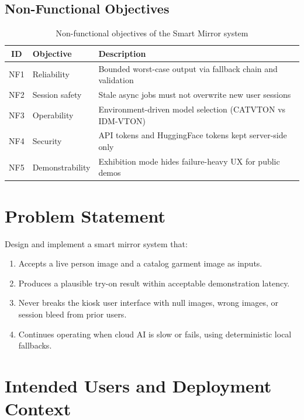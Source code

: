 \subsection{Non-Functional Objectives}

\begin{table}[H]
  \centering
  \caption{Non-functional objectives of the Smart Mirror system}
  \label{tab:nonfunctional-objectives}
  \begin{tabular}{@{}clp{9cm}@{}}
    \toprule
    \textbf{ID} & \textbf{Objective} & \textbf{Description} \\
    \midrule
    NF1 & Reliability & Bounded worst-case output via fallback chain and validation \\
    NF2 & Session safety & Stale async jobs must not overwrite new user sessions \\
    NF3 & Operability & Environment-driven model selection (CATVTON vs IDM-VTON) \\
    NF4 & Security & API tokens and HuggingFace tokens kept server-side only \\
    NF5 & Demonstrability & Exhibition mode hides failure-heavy UX for public demos \\
    \bottomrule
  \end{tabular}
\end{table}

\section{Problem Statement}
\label{sec:problem-statement}

Design and implement a smart mirror system that:

\begin{enumerate}[leftmargin=*]
  \item Accepts a live person image and a catalog garment image as inputs.
  \item Produces a plausible try-on result within acceptable demonstration latency.
  \item Never breaks the kiosk user interface with null images, wrong images, or session bleed from prior users.
  \item Continues operating when cloud AI is slow or fails, using deterministic local fallbacks.
\end{enumerate}

\section{Intended Users and Deployment Context}
\label{sec:users}


